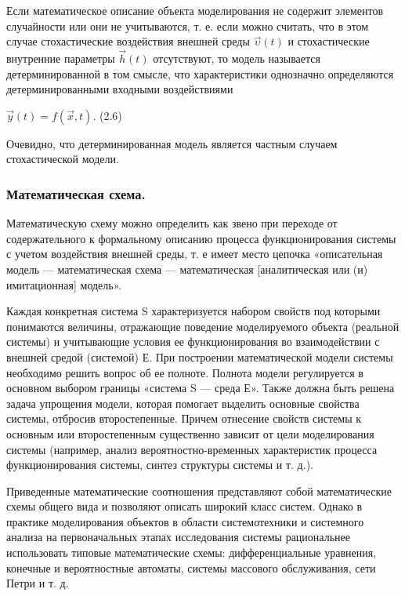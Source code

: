   Если математическое описание объекта моделирования не содержит элементов случайности или они не учитываются, т. е. если можно считать, что в этом случае стохастические воздействия внешней среды $\vec{\upsilon}(t)$ и стохастические внутренние параметры $\vec{h}(t)$ отсутствуют, то модель называется детерминированной в том смысле, что характеристики однозначно определяются детерминированными входными воздействиями

  \begin{center}
    $\vec{y}(t) = f(\vec{x}, t)$. (2.6)
  \end{center}

  Очевидно, что детерминированная модель является частным случаем стохастической модели.

\subsubsection{Математическая схема.}

  Математическую схему можно определить как звено при переходе от содержательного к формальному описанию процесса функционирования системы с учетом воздействия внешней среды, т. е имеет место цепочка «описательная модель — математическая схема — математическая [аналитическая или (и) имитационная] модель».

  Каждая конкретная система S характеризуется набором свойств под которыми понимаются величины, отражающие поведение моделируемого объекта (реальной системы) и учитывающие условия ее функционирования во взаимодействии с внешней средой (системой) Е. При построении математической модели системы необходимо решить вопрос об ее полноте. Полнота модели регулируется в основном выбором границы «система S — среда Е». Также должна быть решена задача упрощения модели, которая помогает выделить основные свойства системы, отбросив второстепенные. Причем отнесение свойств системы к основным или второстепенным существенно зависит от цели моделирования системы (например, анализ вероятностно-временных характеристик процесса функционирования системы, синтез структуры системы и т. д.).

  Приведенные математические соотношения представляют собой математические схемы общего вида и позволяют описать широкий класс систем. Однако в практике моделирования объектов в области системотехники и системного анализа на первоначальных этапах исследования системы рациональнее использовать типовые математические схемы: дифференциальные уравнения, конечные и вероятностные автоматы, системы массового обслуживания, сети Петри и т. д.

